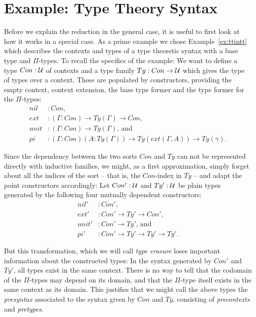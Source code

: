 \section{Example: Type Theory Syntax}

Before we explain the reduction in the general case, it is useful to first
look at how it works in a special case.
As a prime example we chose Example~\ref{ex:ttintt} which describes
the contexts and types of a type theoretic syntax with a base type and $\Pi$-types.
To recall the specifics of the example: We want to define a type
$Con : \mathcal{U}$ of contexts and a type family $Ty : Con \to \mathcal{U}$ which gives the
type of types over a context.
These are populated by constructors, providing the empty context,
context extension, the base type former and the type former for the $\Pi$-types:
\begin{align*}
nil &: Con \text{,} \\
ext &: (\Gamma : Con) \to Ty(\Gamma) \to Con \text{,} \\
unit &: (\Gamma : Con) \to Ty(\Gamma) \text{, and} \\
pi &: (\Gamma : Con) (A : Ty(\Gamma)) \to Ty(ext(\Gamma, A)) \to Ty(\gamma) \text{.}
\end{align*}

Since the dependency between the two sorts $Con$ and $Ty$ can not be represented
directly with inductive families, we might, as a first approximation, simply forget
about all the indices of the sort -- that is, the $Con$-index in $Ty$ --
and adapt the point constructors accordingly:
Let $Con' : \mathcal{U}$ and $Ty' : \mathcal{U}$ be plain types generated by the following four
mutually dependent constructors:
\begin{align*}
nil' &: Con' \text{,} \\
ext' &: Con' \to Ty' \to Con' \text{,} \\
unit' &: Con' \to Ty' \text{, and} \\
pi' &: Con' \to Ty' \to Ty' \to Ty' \text{.}
\end{align*}

But this transformation, which we will call \emph{type erasure} loses important
information about the constructed types:
In the syntax generated by $Con'$ and $Ty'$, all types exist in the same context.
There is no way to tell that the codomain of the $\Pi$-types may depend on its domain,
and that the $\Pi$-type itself exists in the same context as its domain.
This justifies that we might call the above types the \emph{presyntax} associated
to the syntax given by $Con$ and $Ty$, consisting of \emph{precontexts} and
\emph{pretypes}.

